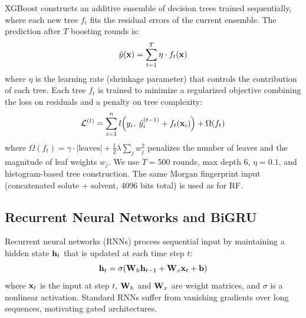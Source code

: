 XGBoost\cite{chen2016xgboost} constructs an additive ensemble of decision trees trained sequentially, where each new tree $f_t$ fits the residual errors of the current ensemble.
The prediction after $T$ boosting rounds is:
\begin{equation}
    \hat{y}(\mathbf{x}) = \sum_{t=1}^{T} \eta \cdot f_t(\mathbf{x})
\end{equation}
where $\eta$ is the learning rate (shrinkage parameter) that controls the contribution of each tree.
Each tree $f_t$ is trained to minimize a regularized objective combining the loss on residuals and a penalty on tree complexity:
\begin{equation}
    \mathcal{L}^{(t)} = \sum_{i=1}^{n} l\!\left(y_i,\; \hat{y}_i^{(t-1)} + f_t(\mathbf{x}_i)\right) + \Omega(f_t)
\end{equation}
where $\Omega(f_t) = \gamma \cdot |\text{leaves}| + \tfrac{1}{2}\lambda \sum_j w_j^2$ penalizes the number of leaves and the magnitude of leaf weights $w_j$.
We use $T = 500$ rounds, max depth 6, $\eta = 0.1$, and histogram-based tree construction.
The same Morgan fingerprint input (concatenated solute + solvent, 4096 bits total) is used as for RF.


\subsection{Recurrent Neural Networks and BiGRU}
\label{sec:bigru}

Recurrent neural networks (RNNs)\cite{elman1990finding} process sequential input by maintaining a hidden state $\mathbf{h}_t$ that is updated at each time step $t$:
\begin{equation}
    \mathbf{h}_t = \sigma(\mathbf{W}_h \mathbf{h}_{t-1} + \mathbf{W}_x \mathbf{x}_t + \mathbf{b})
\end{equation}
where $\mathbf{x}_t$ is the input at step $t$, $\mathbf{W}_h$ and $\mathbf{W}_x$ are weight matrices, and $\sigma$ is a nonlinear activation.
Standard RNNs suffer from vanishing gradients over long sequences, motivating gated architectures.

